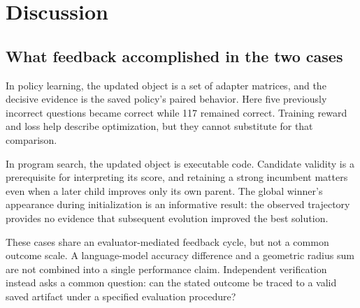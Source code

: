 \section{Discussion}
\subsection{What feedback accomplished in the two cases}
In policy learning, the updated object is a set of adapter matrices, and the decisive evidence is the saved policy's paired behavior. Here five previously incorrect questions became correct while 117 remained correct. Training reward and loss help describe optimization, but they cannot substitute for that comparison.

In program search, the updated object is executable code. Candidate validity is a prerequisite for interpreting its score, and retaining a strong incumbent matters even when a later child improves only its own parent. The global winner's appearance during initialization is an informative result: the observed trajectory provides no evidence that subsequent evolution improved the best solution.

These cases share an evaluator-mediated feedback cycle, but not a common outcome scale. A language-model accuracy difference and a geometric radius sum are not combined into a single performance claim. Independent verification instead asks a common question: can the stated outcome be traced to a valid saved artifact under a specified evaluation procedure?

